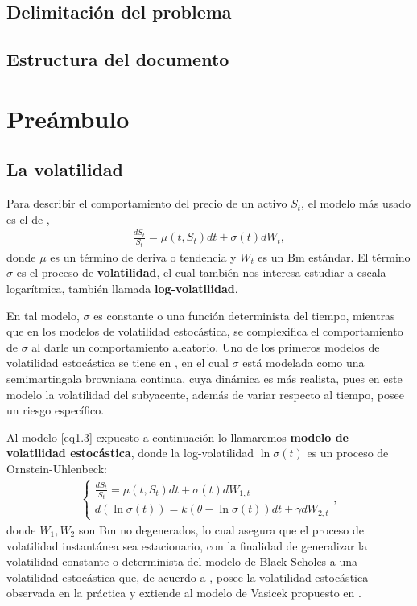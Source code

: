 \documentclass[letterpaper,12pt,oneside]{book}
\theoremstyle{plain}
\numberwithin{theorem}{section}
\begin{document}
\section*{Delimitación del problema}
\section*{Estructura del documento}
\chapter{Preámbulo}%
\section{La volatilidad}
Para describir el comportamiento del precio de un activo $S_t$, el modelo más usado es el de \cite{black_pricing_1973-1},
\begin{align}\label{ec1.2}
	\frac{dS_t}{S_t}=\mu(t,S_t)dt+\sigma(t)dW_t,
\end{align}
donde $\mu$ es un término de deriva o tendencia y $W_t$ es un Bm estándar. El término $\sigma$ es el proceso de \textbf{volatilidad}, el cual también nos interesa estudiar a escala logarítmica, también llamada \textbf{log-volatilidad}.

En tal modelo, $\sigma$ es constante o una función determinista del tiempo, mientras que en los modelos de volatilidad estocástica, se complexifica el comportamiento de $\sigma$ al darle un comportamiento aleatorio. Uno de los primeros modelos de volatilidad estocástica se tiene en \cite{hull_one-factor_1993}, en el cual $\sigma$ está modelada como una semimartingala browniana continua, cuya dinámica es más realista, pues en este modelo la volatilidad del subyacente, además de variar respecto al tiempo, posee un riesgo específico.

Al modelo \ref{eq1.3} expuesto a continuación lo llamaremos \textbf{modelo de volatilidad estocástica}, donde la log-volatilidad $\ln\sigma(t)$ es un proceso de Ornstein-Uhlenbeck:
\begin{align}\label{eq1.3}
	\left\{\begin{matrix}\frac{dS_t}{S_t}=\mu(t,S_t)dt+\sigma(t)dW_{1,t}\\d(\ln \sigma(t))=k(\theta-\ln \sigma(t))dt+\gamma dW_{2,t} \end{matrix}\right.,
\end{align}
donde $W_1,W_2$ son Bm no degenerados, lo cual asegura que el proceso de volatilidad instantánea sea estacionario, con la finalidad de generalizar la volatilidad constante o determinista del modelo de Black-Scholes a una volatilidad estocástica que, de acuerdo a \cite{hull_one-factor_1993}, posee la volatilidad estocástica observada en la práctica y extiende al modelo de Vasicek propuesto en \cite{hull_pricing_1990}.
\end{document}
